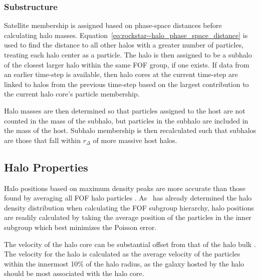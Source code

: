 \subsubsection{Substructure}
\label{subsubsec:rockstar--halo_finding--substructure}


Satellite membership is assigned based on phase-space distances before calculating halo masses.  Equation~\ref{eq:rockstar--halo_phase_space_distance} is used to find the distance to all other halos with a greater number of particles, treating each halo center as a particle.  The halo is then assigned to be a subhalo of the closest larger halo within the same FOF group, if one exists.  If data from an earlier time-step is available, then halo cores at the current time-step are linked to halos from the previous time-step based on the largest contribution to the current halo core's particle membership.

Halo masses are then determined so that particles assigned to the host are not counted in the mass of the subhalo, but particles in the subhalo are included in the mass of the host.  Subhalo membership is then recalculated such that subhalos are those that fall within $r_{\Delta}$ of more massive host halos.




\subsection{Halo Properties}
\label{subsec:rockstar--halo_properties}


Halo positions based on maximum density peaks are more accurate than those found by averaging all FOF halo particles \citep{2011MNRAS.415.2293K}.  As \rockstar\ has already determined the halo density distribution when calculating the FOF subgroup hierarchy, halo positions are readily calculated by taking the average position of the particles in the inner subgroup which best minimizes the Poisson error.

The velocity of the halo core can be substantial offset from that of the halo bulk \citep{2013ApJ...762..109B}.  The velocity for the halo is calculated as the average velocity of the particles within the innermost 10\% of the halo radius, as the galaxy hosted by the halo should be most associated with the halo core.

